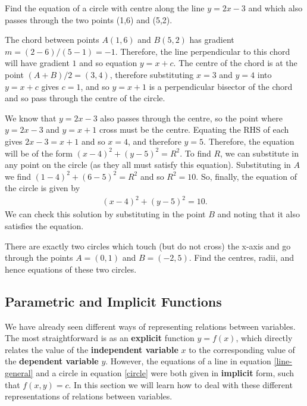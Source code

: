 \begin{example}[Video]
    Find the equation of a circle with centre along the line $y=2x-3$ and which also passes through the two points (1,6) and (5,2). 
\end{example}
\begin{solution}
    The chord between points $A(1,6)$ and $B(5,2)$ has gradient $m = (2-6)/(5-1) = -1$. Therefore, the line perpendicular to this chord will have gradient $1$ and so equation $y = x + c$. The centre of the chord is at the point $(A+B)/2 = (3,4)$, therefore substituting $x=3$ and $y=4$ into $y = x + c$ gives $c = 1$, and so $y=x+1$ is a perpendicular bisector of the chord and so pass through the centre of the circle. 
    
    We know that $y=2x-3$ also passes through the centre, so the point where $y=2x-3$ and $y=x+1$ cross must be the centre. Equating the RHS of each gives $2x-3=x+1$ and so $x=4$, and therefore $y=5$. Therefore, the equation will be of the form $(x-4)^2 + (y-5)^2 = R^2$. To find $R$, we can substitute in any point on the circle (as they all must satisfy this equation). Substituting in $A$ we find $(1-4)^2+(6-5)^2=R^2$ and so $R^2=10$. So, finally, the equation of the circle is given by
    \begin{align*}
        (x-4)^2 + (y-5)^2 = 10.
    \end{align*}
    We can check this solution by substituting in the point $B$ and noting that it also satisfies the equation. 
\end{solution}

\begin{example}[Video]
    There are exactly two circles which touch (but do not cross) the x-axis and go through the points $A = (0, 1)$ and $B = (-2, 5)$. Find the centres, radii, and hence equations of these two circles.
\end{example}
\begin{solution}
    
\end{solution}

\newpage
\subsection{Parametric and Implicit Functions}
\label{sec:param_implic}
We have already seen different ways of representing relations between variables. The most straightforward is as an \textbf{explicit} function $y = f(x)$, which directly relates the value of the \textbf{independent variable} $x$ to the corresponding value of the \textbf{dependent variable} $y$. However, the equations of a line in equation \eqref{line-general} and a circle in equation \eqref{circle} were both given in \textbf{implicit} form, such that  $f(x,y) = c$. In this section we will learn how to deal with these different representations of relations between variables.

